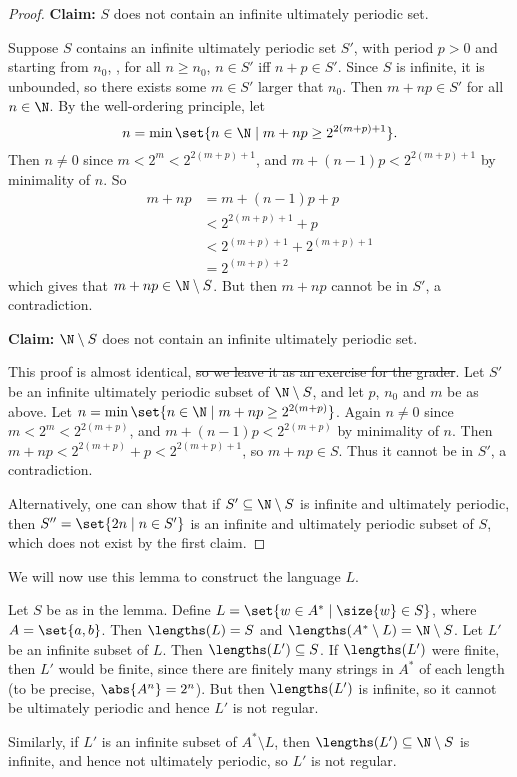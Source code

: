 \documentclass[12pt]{article}
\begin{document}
\begin{proof}
    \textbf{Claim:} $S$ does not contain an infinite ultimately periodic
    set.

    Suppose $S$ contains an infinite ultimately periodic set $S'$,
    with period $p > 0$ and starting from $n_0$, \ie,
    for all $n \ge n_0$, $n \in S'$ iff $n+p \in S'$.
    Since $S$ is infinite, it is unbounded,
    so there exists some $m \in S'$ larger that $n_0$.
    Then $m+np \in S'$ for all $n \in \N$.
    By the well-ordering principle, let \[
        n = \min\set{n \in \N \mid m+np \ge 2^{2(m + p) + 1}}.
    \] Then $n \ne 0$ since $m < 2^m < 2^{2(m+p) + 1}$,
    and $m + (n-1)p < 2^{2(m+p) + 1}$ by minimality of $n$.
    So \begin{align*}
        m + np &= m + (n-1)p + p \\
        &< 2^{2(m+p) + 1} + p \\
        &< 2^{(m+p)+1} + 2^{(m+p)+1} \\
        &= 2^{(m+p)+2}
    \end{align*} which gives that $m+np \in \N \setminus S$.
    But then $m+np$ cannot be in $S'$, a contradiction.

    \textbf{Claim:} $\N \setminus S$ does not contain an infinite
    ultimately periodic set.

    This proof is almost identical,
    \sout{so we leave it as an exercise for the grader}.
    Let $S'$ be an infinite ultimately periodic subset of
    $\N \setminus S$, and let $p$, $n_0$ and $m$ be as above.
    Let $n = \min\set{n \in \N \mid m+np \ge 2^{2(m+p)}}$.
    Again $n \ne 0$ since $m < 2^m < 2^{2(m+p)}$, and $m + (n-1)p
    < 2^{2(m+p)}$ by minimality of $n$.
    Then $m+np < 2^{2(m+p)} + p < 2^{2(m+p)+1}$, so $m+np \in S$.
    Thus it cannot be in $S'$, a contradiction.

    Alternatively, one can show that if $S' \subseteq \N \setminus S$ is
    infinite and ultimately periodic, then $S'' = \set{2n \mid n \in S'}$
    is an infinite and ultimately periodic subset of $S$,
    which does not exist by the first claim.
\end{proof}
We will now use this lemma to construct the language $L$.
\begin{solution}
    Let $S$ be as in the lemma.
    Define $L = \set{w \in A^* \mid \size{w} \in S}$, where $A = \set{a, b}$.
    Then $\lengths(L) = S$ and $\lengths(A^* \setminus L) = \N \setminus S$.
    Let $L'$ be an infinite subset of $L$.
    Then $\lengths(L') \subseteq S$.
    If $\lengths(L')$ were finite, then $L'$ would be finite,
    since there are finitely many strings in $A^*$ of each length
    (to be precise, $\abs{A^n} = 2^n$).
    But then $\lengths(L')$ is infinite, so it cannot be ultimately periodic
    and hence $L'$ is not regular.

    Similarly, if $L'$ is an infinite subset of $A^* \setminus L$,
    then $\lengths(L') \subseteq \N \setminus S$ is infinite, and hence
    not ultimately periodic, so $L'$ is not regular.
\end{solution}
\end{document}
